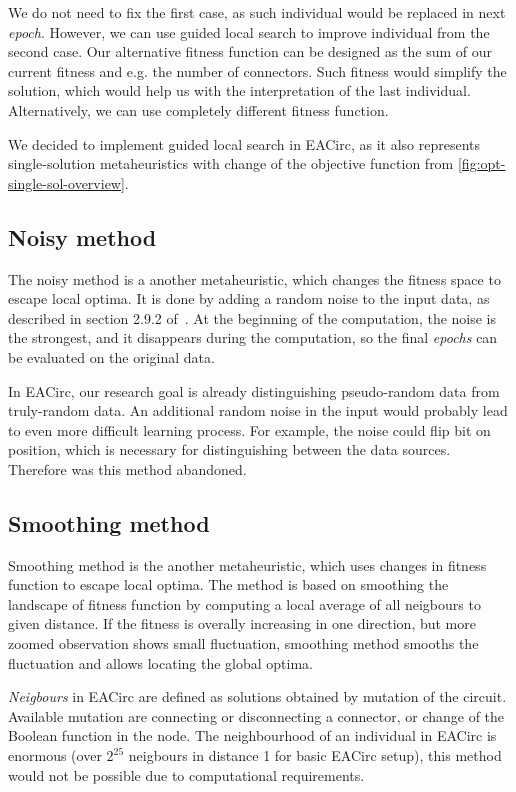 \documentclass[
  print, %
  Table,   %
  nolof,     %
  nolot,     %
  11pt, %
  oneside  %
]{fithesis3}
\begin{document}
We do not need to fix the first case, as such individual would be replaced in next \textit{epoch}. However, we can use guided local search to improve individual from the second case. Our alternative fitness function can be designed as the sum of our current fitness and e.g. the number of connectors. Such fitness would simplify the solution, which would help us with the interpretation of the last individual. Alternatively, we can use completely different fitness function.

We decided to implement guided local search in EACirc, as it also represents single-solution metaheuristics with change of the objective function from \cref{fig:opt-single-sol-overview}.

\subsection{Noisy method}
\label{subsec:opt-single-sol-nois}

The noisy method is a another metaheuristic, which changes the fitness space to escape local optima. It is done by adding a random noise to the input data, as described in section 2.9.2 of~\cite{talbi2009metaheuristics}. At the beginning of the computation, the noise is the strongest, and it disappears during the computation, so the final \textit{epochs} can be evaluated on the original data.

In EACirc, our research goal is already distinguishing pseudo-random data from truly-random data. An additional random noise in the input would probably lead to even more difficult learning process. For example, the noise could flip bit on position, which is necessary for distinguishing between the data sources. Therefore was this method abandoned.
\subsection{Smoothing method}
\label{subsec:opt-single-sol-smooth}

Smoothing method is the another metaheuristic, which uses changes in fitness function to escape local optima. The method is based on smoothing the landscape of fitness function by computing a local average of all neigbours to given distance. If the fitness is overally increasing in one direction, but more zoomed observation shows small fluctuation, smoothing method smooths the fluctuation and allows locating the global optima.

\textit{Neigbours} in EACirc are defined as solutions obtained by mutation of the circuit. Available mutation are connecting or disconnecting a connector, or change of the Boolean function in the node. The neighbourhood of an individual in EACirc is enormous (over $2^{25}$ neigbours in distance 1 for basic EACirc setup), this method would not be possible due to computational requirements.
\end{document}
